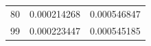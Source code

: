 \documentclass{jreport}		%
\begin{document}
\begin{table}
\begin{center}
\begin{tabular}{c|cc}
80&0.000214268&0.000546847 \\
99&0.000223447&0.000545185 \\ \hline
  \end{tabular}
  \end{center}
\end{table}
\end{document}
